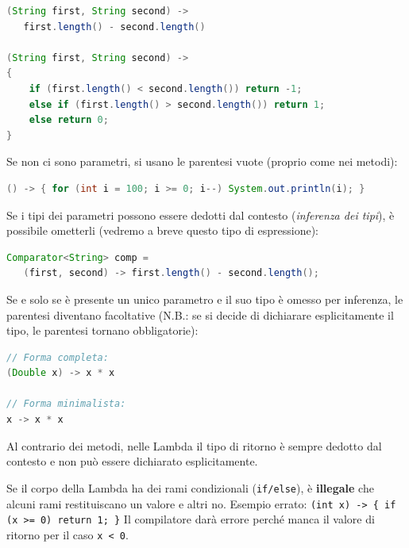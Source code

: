 \begin{lstlisting}[language=Java, caption={Esempi di sintassi delle Lambda Expressions}]
(String first, String second) ->
   first.length() - second.length()

(String first, String second) ->
{
    if (first.length() < second.length()) return -1;
    else if (first.length() > second.length()) return 1;
    else return 0;
}

\end{lstlisting}

Se non ci sono parametri, si usano le parentesi vuote (proprio come nei metodi):
\begin{lstlisting}[language=Java, caption={}]
() -> { for (int i = 100; i >= 0; i--) System.out.println(i); }
\end{lstlisting}

Se i tipi dei parametri possono essere dedotti dal contesto (\textit{inferenza dei tipi}), è possibile ometterli (vedremo a breve questo tipo di espressione):

\begin{lstlisting}[language=Java, caption={}]
Comparator<String> comp =
   (first, second) -> first.length() - second.length();
\end{lstlisting}

 Se e solo se è presente un unico parametro e il suo tipo è omesso per inferenza, le parentesi diventano facoltative (N.B.: se si decide di dichiarare esplicitamente il tipo, le parentesi tornano obbligatorie):

\begin{lstlisting}[language=Java, caption={}]
// Forma completa:
(Double x) -> x * x

// Forma minimalista:
x -> x * x
\end{lstlisting}

\begin{observation}
    Al contrario dei metodi, nelle Lambda il tipo di ritorno è sempre dedotto dal contesto e non può essere dichiarato esplicitamente.
\end{observation}

\begin{warningbox}
    Se il corpo della Lambda ha dei rami condizionali (\texttt{if/else}), è \textbf{illegale} che alcuni rami restituiscano un valore e altri no. 
Esempio errato: \texttt{(int x) -> \{ if (x >= 0) return 1; \}} 
Il compilatore darà errore perché manca il valore di ritorno per il caso \texttt{x < 0}.
\end{warningbox}

